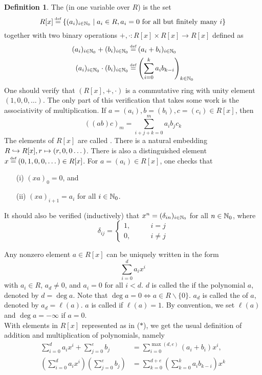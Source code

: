 \documentclass[11pt]{book}
\theoremstyle{definition}   \newtheorem{defn}[counter]{Definition} %
\newcommand{\bs}{\backslash}   \newcommand{\A}{\mathcal{A}}   \newcommand{\sy}{\textnormal{Syl}}   \newcommand{\size}[1]{\left| #1 \right|}
\newcommand\myeq{\mathrel{\overset{\makebox[0pt]{\mbox{\normalfont\tiny\sffamily \textrm{def}}}}{=}}}
\DeclareMathOperator{\ra}{\rightarrow}   \DeclareMathOperator{\Poly}{\mathbf{P}}   \DeclareMathOperator{\spn}{\textnormal{span}}   \DeclareMathOperator{\aut}{\textnormal{Aut}}
\newcommand{\vs}{\vspace{8pt}}
\numberwithin{counter}{chapter}
\begin{document}
\begin{defn}
The  (in one variable over $R$) is the set
	\[R[x] \myeq \{(a_i)_{i \in \N_0} \mid a_i \in R, a_i=0 \tn{ for all but finitely many }i \} \]
together with two binary operations $+, \cdot : R[x] \times R[x] \ra R[x]$ defined as
\begin{align*}
(a_i)_{i \in \N_0} + (b_i)_{i \in \N_0} &\myeq (a_i + b_i)_{i \in \N_0} \\
(a_i)_{i \in \N_0} \cdot (b_i)_{i \in \N_0} &\myeq \left(\sum_{i=0}^k a_i b_{k-i}\right)_{k \in \N_0}
\end{align*}
One should verify that $(R[x],+,\cdot)$ is a commutative ring with unity element $(1,0,0,\dots)$. The only part of this verification that takes some work is the associativity of multiplication. If $a = (a_i),b=(b_i),c=(c_i) \in R[x]$, then
	\[((ab)c)_m = \sum_{i+j+k=0}^m a_i b_j c_k \]
The elements of $R[x]$ are called . There is a natural embedding $R \hookrightarrow R[x], r \mapsto (r,0,0\dots)$. There is also a distinguished element $x \myeq (0,1,0,0,\dots) \in R[x]$. For $a = (a_i) \in R[x]$, one checks that
\begin{enumerate}
\item[(i)] $(xa)_0 = 0$, and
\item[(ii)] $(xa)_{i+1} = a_i$ for all $i \in \operatorname{\mathbb{N}}_0$.
\end{enumerate}
It should also be verified (inductively) that $x^n = (\delta_{in})_{i \in \operatorname{\mathbb{N}}_0}$ for all $n \in \operatorname{\mathbb{N}}_0$, where
	\[\delta_{ij} = \begin{cases}
	1, \qquad & i = j \\
	0, & i \ne j
	\end{cases} \]
\end{defn}

\vs

\begin{lemma}[\& Definition]
Any nonzero element $a \in R[x]$ can be uniquely written in the form \[\sum_{i=0}^d a_i x^i \tag{$\ast$} \]
with $a_i \in R$, $a_d \ne 0$, and $a_i = 0$ for all $i < d$. $d$ is called the  if the polynomial $a$, denoted by $d = \deg a$. Note that $\deg a = 0 \iff a \in R \bs \{0\}$. $a_d$ is called the  of $a$, denoted by $a_d = \ell(a)$. $a$ is called  if $\ell(a) = 1$. By convention, we set $\ell(a)$ and $\deg a = -\infty$ if $a = 0$. \\

With elements in $R[x]$ represented as in ($\ast$), we get the usual definition of addition and multiplication of polynomials, namely
\begin{align*}
\sum_{i=0}^d a_i x^i + \sum_{j=0}^e b_j &= \sum_{i=0}^{\max(d,e)} (a_i + b_i)x^i, \\
\left( \sum_{i=0}^d a_i x^i\right) \left( \sum_{j=0}^e b_j\right) &= \sum_{k=0}^{d+e} \left(\sum_{k=0}^k a_i b_{k-i}\right) x^k
\end{align*}
\end{lemma}
\end{document}
